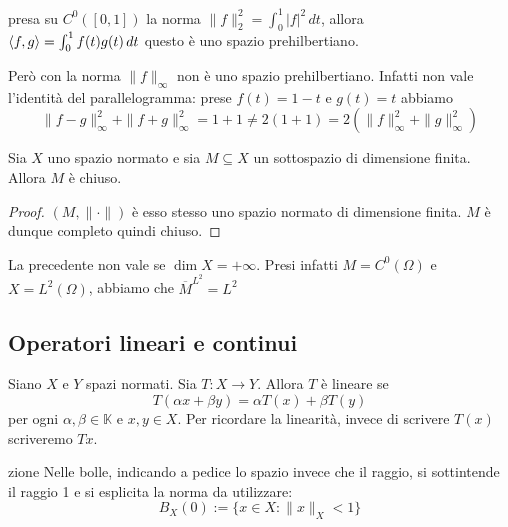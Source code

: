 \begin{remark}{}
    presa su \(C^{0}{([0,1])}\) la norma \(\|f\|_2^2 = \int_{0}^{1} |f|^2 \,dt \), allora \\\({\left\langle f,g\right\rangle} = \int_{0}^{1} f{(t)}g{(t)} \,dt \) questo è uno spazio prehilbertiano.

    Però con la norma \(\|f\|_{\infty}\) non è uno spazio prehilbertiano.
    Infatti non vale l'identità del parallelogramma: prese \(f{(t)}=1-t\) e \(g{(t)}= t\) abbiamo
\[
  \|f-g\|^2_{\infty} + \|f+g\|^2_\infty = 1+1\neq  2{(1 + 1)} = 2{(\|f\|^2_\infty + \|g\|^2_\infty)}
\]
\end{remark}
\begin{corollary}{}
    Sia \(X\) uno spazio normato e sia \(M \subseteq X  \) un sottospazio di
    dimensione finita. Allora \(M\) è chiuso.
\end{corollary}
\begin{proof}{}
    \({(M, \|\cdot \|)}\) è esso stesso uno spazio normato di dimensione finita.
    \(M\) è dunque completo quindi chiuso.
\end{proof}

\begin{example}{}
    La precedente non vale se \(\dim X = +\infty\). Presi infatti \(M = C^{0}{(\Omega)}\) e \(X = L^2{(\Omega)}\), abbiamo che \(\overline{M}^{L^2} = L^2\) 
\end{example}

\subsection{Operatori lineari e continui}

Siano \(X\) e \(Y\) spazi normati. Sia \(
T: X\to Y\). Allora \(T\) è lineare se \[T{(\alpha x + \beta y)} = \alpha T{(x)} + \beta T{(y)}\] per ogni \(\alpha, \beta \in \mathbb{K}\) e \(x,y \in X\). Per ricordare la linearità, invece di scrivere \(T{(x)}\) scriveremo \(Tx\).

\begin{note}{zione}
    Nelle bolle, indicando a pedice lo spazio invece che il raggio, si sottintende il raggio
    1 e si esplicita la norma da utilizzare:
\[
  B_X{(0)} := \{x \in  X : \|x\|_X < 1\} 
\]
\end{note}

